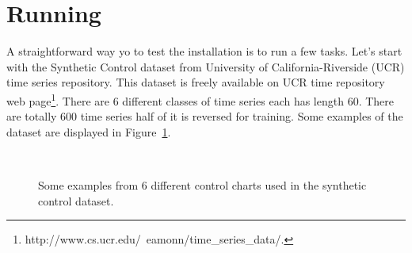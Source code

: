 \documentclass{article}
\begin{document}
\section{Running}
A straightforward way yo to test the installation is to run a few tasks. Let's start with the Synthetic Control dataset from University of California-Riverside (UCR) time series repository. This dataset is freely available on UCR time repository web page\footnote{http://www.cs.ucr.edu/~eamonn/time\_series\_data/.}. There are $6$ different classes of time series each has length $60$. There are totally $600$ time series half of it is reversed for training. Some examples of the dataset are displayed in Figure~\ref{fig_synthetic}.

	\begin{figure}[!h]
	\centering
	\\%
	\caption{Some examples from 6 different control charts used in the synthetic control dataset.}
	\label{fig_synthetic}
	\end{figure}
\end{document}
